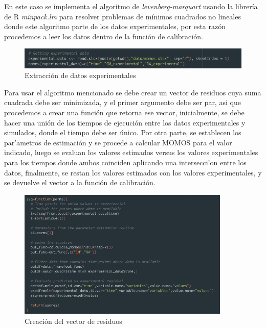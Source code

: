 En este caso se implementa el algoritmo de \textit{levenberg-marquart} usando la librer\'ia de R \textit{minpack.lm} para resolver problemas de m\'inimos cuadrados no lineales donde este algoritmo parte de los datos experimentales, por esta raz\'on procedemos a leer los datos dentro de la funci\'on de calibraci\'on.\\

\begin{figure}[H]
  \centering
    \begin{minipage}{1\textwidth}
      \centering
      \includegraphics[width=1\textwidth]{figure_4_14.png}
      \caption{Extracci\'on de datos experimentales}
      \label{fig:Fig}
    \end{minipage}%
    \hspace{5mm}
\end{figure}

Para usar el algoritmo mencionado se debe crear un vector de residuos cuya suma cuadrada debe ser
minimizada, y el primer argumento debe ser par, asi que procedemos a crear una funci\'on que retorna ese vector, inicialmente, se debe hacer una uni\'on de los tiempos de ejecuci\'on entre los datos experimentales y simulados, donde el tiempo debe ser \'unico. Por otra parte, se establecen los par'ametros de estimaci\'on y se procede a calcular MOMOS para el valor indicado, luego se evaluan los valores estimados versus los valores experimentales para los tiempos donde ambos coinciden aplicando una intersecci'on entre los datos, finalmente, se restan los valores estimados con los valores experimentales, y se devuelve el vector a la funci\'on de calibraci\'on.\\

\begin{figure}[H]
  \centering
    \begin{minipage}{0.9\textwidth}
      \centering
      \includegraphics[width=0.9\textwidth]{figure_4_15.png}
      \caption{Creaci\'on del vector de residuos}
      \label{fig:Fig}
    \end{minipage}%
    \hspace{5mm}
\end{figure}

